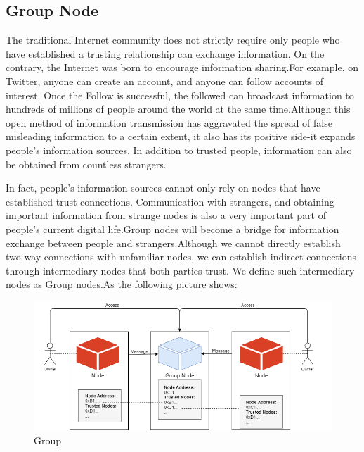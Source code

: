 \documentclass{article}
\begin{document}
\subsection{Group Node}\label{group_node}
    The traditional Internet community does not strictly require only people who have established a trusting relationship can exchange information. On the contrary, the Internet was born to encourage information sharing.For example, on Twitter, anyone can create an account, and anyone can follow accounts of interest. Once the Follow is successful, the followed can broadcast information to hundreds of millions of people around the world at the same time.Although this open method of information transmission has aggravated the spread of false misleading information to a certain extent, it also has its positive side-it expands people's information sources. In addition to trusted people, information can also be obtained from countless strangers.

    In fact, people's information sources cannot only rely on nodes that have established trust connections. Communication with strangers, and obtaining important information from strange nodes is also a very important part of people's current digital life.Group nodes will become a bridge for information exchange between people and strangers.Although we cannot directly establish two-way connections with unfamiliar nodes, we can establish indirect connections through intermediary nodes that both parties trust. We define such intermediary nodes as Group nodes.As the following picture shows:

    \begin{figure}[H]
        \centering
        \includegraphics[width=\textwidth]{figures-group.png}
        \caption{Group}
    \end{figure}
    
\end{document}
